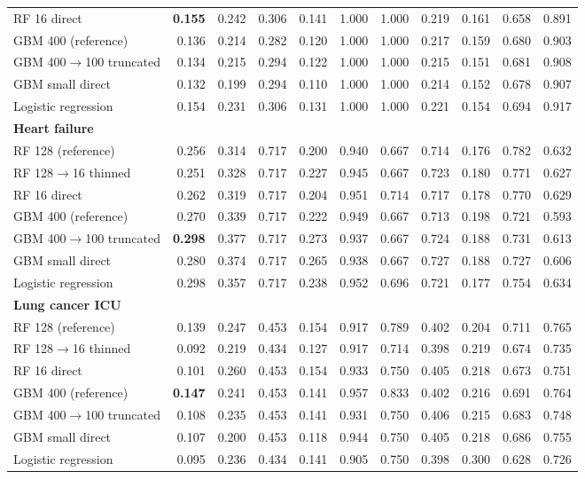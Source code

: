 {\begin{longtable}{lrrrrrrrrrr}
\quad RF 16 direct & \textbf{0.155} & 0.242 & 0.306 & 0.141 & 1.000 & 1.000 & 0.219 & 0.161 & 0.658 & 0.891 \\
\quad GBM 400 (reference) & 0.136 & 0.214 & 0.282 & 0.120 & 1.000 & 1.000 & 0.217 & 0.159 & 0.680 & 0.903 \\
\quad GBM 400$\rightarrow$100 truncated & 0.134 & 0.215 & 0.294 & 0.122 & 1.000 & 1.000 & 0.215 & 0.151 & 0.681 & 0.908 \\
\quad GBM small direct & 0.132 & 0.199 & 0.294 & 0.110 & 1.000 & 1.000 & 0.214 & 0.152 & 0.678 & 0.907 \\
\quad Logistic regression & 0.154 & 0.231 & 0.306 & 0.131 & 1.000 & 1.000 & 0.221 & 0.154 & 0.694 & 0.917 \\
\midrule
\multicolumn{11}{l}{\textbf{Heart failure}} \\*
\quad RF 128 (reference) & 0.256 & 0.314 & 0.717 & 0.200 & 0.940 & 0.667 & 0.714 & 0.176 & 0.782 & 0.632 \\
\quad RF 128$\rightarrow$16 thinned & 0.251 & 0.328 & 0.717 & 0.227 & 0.945 & 0.667 & 0.723 & 0.180 & 0.771 & 0.627 \\
\quad RF 16 direct & 0.262 & 0.319 & 0.717 & 0.204 & 0.951 & 0.714 & 0.717 & 0.178 & 0.770 & 0.629 \\
\quad GBM 400 (reference) & 0.270 & 0.339 & 0.717 & 0.222 & 0.949 & 0.667 & 0.713 & 0.198 & 0.721 & 0.593 \\
\quad GBM 400$\rightarrow$100 truncated & \textbf{0.298} & 0.377 & 0.717 & 0.273 & 0.937 & 0.667 & 0.724 & 0.188 & 0.731 & 0.613 \\
\quad GBM small direct & 0.280 & 0.374 & 0.717 & 0.265 & 0.938 & 0.667 & 0.727 & 0.188 & 0.727 & 0.606 \\
\quad Logistic regression & 0.298 & 0.357 & 0.717 & 0.238 & 0.952 & 0.696 & 0.721 & 0.177 & 0.754 & 0.634 \\
\midrule
\multicolumn{11}{l}{\textbf{Lung cancer ICU}} \\*
\quad RF 128 (reference) & 0.139 & 0.247 & 0.453 & 0.154 & 0.917 & 0.789 & 0.402 & 0.204 & 0.711 & 0.765 \\
\quad RF 128$\rightarrow$16 thinned & 0.092 & 0.219 & 0.434 & 0.127 & 0.917 & 0.714 & 0.398 & 0.219 & 0.674 & 0.735 \\
\quad RF 16 direct & 0.101 & 0.260 & 0.453 & 0.154 & 0.933 & 0.750 & 0.405 & 0.218 & 0.673 & 0.751 \\
\quad GBM 400 (reference) & \textbf{0.147} & 0.241 & 0.453 & 0.141 & 0.957 & 0.833 & 0.402 & 0.216 & 0.691 & 0.764 \\
\quad GBM 400$\rightarrow$100 truncated & 0.108 & 0.235 & 0.453 & 0.141 & 0.931 & 0.750 & 0.406 & 0.215 & 0.683 & 0.748 \\
\quad GBM small direct & 0.107 & 0.200 & 0.453 & 0.118 & 0.944 & 0.750 & 0.405 & 0.218 & 0.686 & 0.755 \\
\quad Logistic regression & 0.095 & 0.236 & 0.434 & 0.141 & 0.905 & 0.750 & 0.398 & 0.300 & 0.628 & 0.726 \\
\bottomrule
\end{longtable}}
